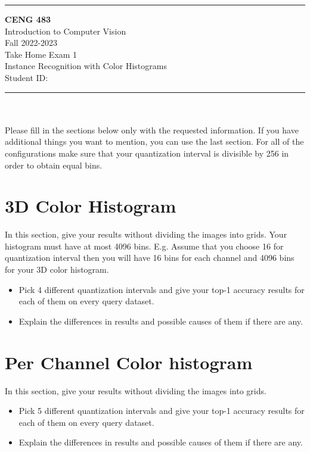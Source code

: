 \documentclass[12pt]{article}
\newcommand{\HRule}{\rule{\linewidth}{1mm}}
\begin{document}
\noindent
\HRule %
\small
\begin{center}
	\LARGE \textbf{CENG 483} \\[4mm]
	\Large Introduction to Computer Vision \\[4mm]
	\normalsize Fall 2022-2023 \\
	\Large Take Home Exam 1 \\
	\Large Instance Recognition with Color Histograms \\
    \Large Student ID: \\
\end{center}
\HRule

\begin{center}
\end{center}
\vspace{-10mm}
\noindent\\ \\ 
Please fill in the sections below only with the requested information. If you have additional things you want to mention, you can use the last section. For all of the configurations make sure that your 
quantization interval is divisible by 256 in order to obtain equal bins.
\section{3D Color Histogram}
In this section, give your results without dividing the images into grids. Your histogram must have at most 4096 bins. E.g. Assume that you choose 16 for quantization interval then you will have 16 bins for each channel and 4096 bins for your 3D color histogram.

\begin{itemize}
\item Pick 4 different quantization intervals and give your top-1 accuracy results for each of them on every query dataset.
\item Explain the differences in results and possible causes of them if there are any.
\end{itemize}

\section{Per Channel Color histogram}
In this section, give your results without dividing the images into grids.

\begin{itemize}
\item Pick 5 different quantization intervals and give your top-1 accuracy results for each of them on every query dataset.
\item Explain the differences in results and possible causes of them if there are any.
\end{itemize}
\end{document}
